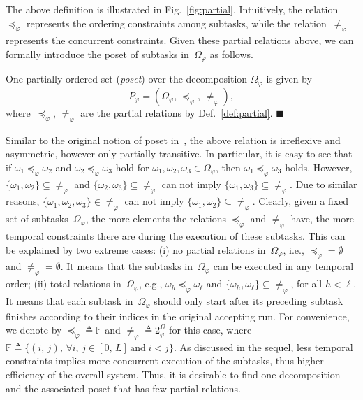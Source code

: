 The above definition is illustrated in Fig.~\ref{fig:partial}.
Intuitively, the relation~$\preceq_{\varphi}$ represents the ordering
constraints among subtasks,
while the relation~$\neq_{\varphi}$ represents the concurrent constraints.
Given these partial relations above, we can formally introduce the poset of subtasks in~$\Omega_{\varphi}$ as follows.


\begin{definition}\label{def:poset}
One partially ordered set (\emph{poset}) over the decomposition $\Omega_{\varphi}$ is given by
\begin{equation}\label{eq:poset}
P_{\varphi} = (\Omega_{\varphi}, \, \preceq_{\varphi}, \, \neq_{\varphi}),
\end{equation}
where~$\preceq_{\varphi}$, $\neq_{\varphi}$ are the partial relations by
Def.~\ref{def:partial}.
\hfill $\blacksquare$
\end{definition}

Similar to the original notion of poset in~\cite{simovici2008mathematical},
the above relation is irreflexive and asymmetric,
however only partially transitive.
In particular, it is easy to see that
if $\omega_1\preceq_{\varphi} \omega_2$ and $\omega_2\preceq_{\varphi} \omega_3$
hold for $\omega_1,\omega_2,\omega_3\in \Omega_{\varphi}$,
then $\omega_1\preceq_{\varphi}\omega_3$ holds.
However, $\{\omega_1,\omega_2\}\subseteq\neq_{\varphi} $ and $\{\omega_2,\omega_3\}\subseteq\neq_{\varphi}$
can not imply $\{\omega_1,\omega_3\}\subseteq\neq_{\varphi}$.
Due to similar reasons, $\{\omega_1,\omega_2,\omega_3\}\in\neq_\varphi$ can not imply $\{\omega_1,\omega_2\}\subseteq\neq_{\varphi}$.
Clearly, given a fixed set of subtasks~$\Omega_{\varphi}$, the more elements
the relations $\preceq_{\varphi}$ and $\neq_{\varphi}$ have,
the more temporal constraints there are during the execution of these subtasks.
This can be explained by two extreme cases:
(i) no partial relations in~$\Omega_{\varphi}$, i.e.,
$\preceq_{\varphi}=\emptyset$ and $\neq_{\varphi}=\emptyset$.
It means that the subtasks in~$\Omega_{\varphi}$ can be executed in any temporal order;
(ii) total relations in~$\Omega_{\varphi}$,
e.g., $\omega_h \preceq_{\varphi} \omega_\ell$
and $\{\omega_h, \omega_\ell \}\subseteq\neq_{\varphi} $, for all $h<\ell$.
It means that each subtask in~$\Omega_{\varphi}$ should only start after
its preceding subtask finishes according to their indices in the original accepting run.
For convenience, we denote by $\preceq_{\varphi} \triangleq \mathbb{F}$
and $\neq_{\varphi} \triangleq 2^\Omega_{\varphi}$ for this case,
where $\mathbb{F}\triangleq \{(i,\, j),\, \forall i,\,j\in [0,\, L] \,\text{and}\; i<j\}$.
As discussed in the sequel,
less temporal constraints implies more concurrent execution of the subtasks,
thus higher efficiency of the overall system.
Thus, it is desirable to find one decomposition and the associated poset
that has few partial relations.


